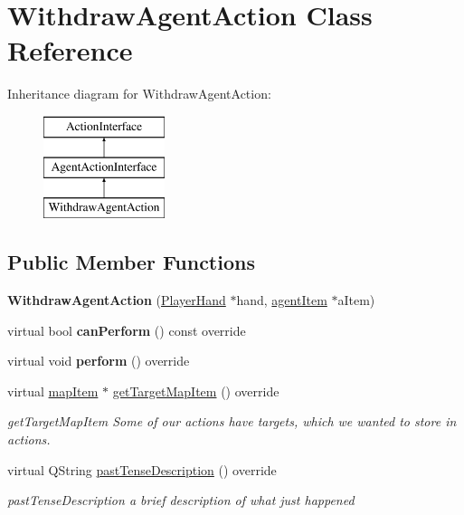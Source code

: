 \hypertarget{class_withdraw_agent_action}{\section{Withdraw\-Agent\-Action Class Reference}
\label{class_withdraw_agent_action}
}
Inheritance diagram for Withdraw\-Agent\-Action\-:\begin{figure}[H]
\begin{center}
\leavevmode
\includegraphics[height=3.000000cm]{class_withdraw_agent_action}
\end{center}
\end{figure}
\subsection*{Public Member Functions}
\begin{DoxyCompactItemize}
\item 
\hypertarget{class_withdraw_agent_action_af4324d8e755a3b8effeeffbb66c14be1}{{\bfseries Withdraw\-Agent\-Action} (\hyperlink{class_player_hand}{Player\-Hand} $\ast$hand, \hyperlink{classagent_item}{agent\-Item} $\ast$a\-Item)}\label{class_withdraw_agent_action_af4324d8e755a3b8effeeffbb66c14be1}

\item 
\hypertarget{class_withdraw_agent_action_ae3d4834fba93ba2d98daa6286c007dec}{virtual bool {\bfseries can\-Perform} () const override}\label{class_withdraw_agent_action_ae3d4834fba93ba2d98daa6286c007dec}

\item 
\hypertarget{class_withdraw_agent_action_a9ca28581e0422dcb7734b6f793a57abf}{virtual void {\bfseries perform} () override}\label{class_withdraw_agent_action_a9ca28581e0422dcb7734b6f793a57abf}

\item 
virtual \hyperlink{classmap_item}{map\-Item} $\ast$ \hyperlink{class_withdraw_agent_action_ae2531701ba456e81f488303f218afffe}{get\-Target\-Map\-Item} () override
\begin{DoxyCompactList}\small\item\em get\-Target\-Map\-Item Some of our actions have targets, which we wanted to store in actions. \end{DoxyCompactList}\item 
virtual Q\-String \hyperlink{class_withdraw_agent_action_a62491bc88210e3100d289e9b04cf2798}{past\-Tense\-Description} () override
\begin{DoxyCompactList}\small\item\em past\-Tense\-Description a brief description of what just happened \end{DoxyCompactList}\end{DoxyCompactItemize}


